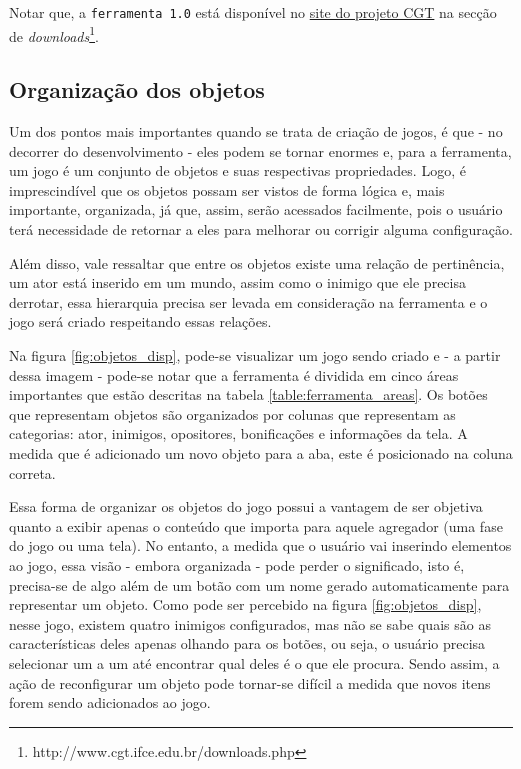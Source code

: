 \documentclass[12pt,twoside,openright,a4paper,english,brazil,sumario=tradicional]{abntex2}
\begin{document}
Notar que, a \texttt{ferramenta 1.0} está disponível no \href{http://www.cgt.ifce.edu.br/downloads.php}{site do projeto CGT} na secção de \emph{downloads}\footnote{http://www.cgt.ifce.edu.br/downloads.php}.

\subsection{Organização dos objetos}
\label{sec:orga-objetos}
Um dos pontos mais importantes quando se trata de criação de jogos, é que - no decorrer do desenvolvimento - eles podem se tornar enormes e, para a ferramenta, um jogo é um conjunto de objetos e suas respectivas propriedades. Logo, é imprescindível que os objetos possam ser vistos de forma lógica e, mais importante, organizada, já que, assim, serão acessados facilmente, pois o usuário terá necessidade de retornar a eles para melhorar ou corrigir alguma configuração.

Além disso, vale ressaltar que entre os objetos existe uma relação de pertinência, um ator está inserido em um mundo, assim como o inimigo que ele precisa derrotar, essa hierarquia precisa ser levada em consideração na ferramenta e o jogo será criado respeitando essas relações.

Na figura \ref{fig:objetos_disp}, pode-se visualizar um jogo sendo criado e - a partir dessa imagem - pode-se notar que a ferramenta é dividida em cinco áreas importantes que estão descritas na tabela \ref{table:ferramenta_areas}. Os botões que representam objetos são organizados por colunas que representam as categorias: ator, inimigos, opositores, bonificações e informações da tela. A medida que é adicionado um novo objeto para a aba, este é posicionado na coluna correta.

Essa forma de organizar os objetos do jogo possui a vantagem de ser objetiva quanto a exibir apenas o conteúdo que importa para aquele agregador (uma fase do jogo ou uma tela). No entanto, a medida que o usuário vai inserindo elementos ao jogo, essa visão - embora organizada - pode perder o significado, isto é, precisa-se de algo além de um botão com um nome gerado automaticamente para representar um objeto. Como pode ser percebido na figura \ref{fig:objetos_disp}, nesse jogo, existem quatro inimigos configurados, mas não se sabe quais são as características deles apenas olhando para os botões, ou seja, o usuário precisa selecionar um a um até encontrar qual deles é o que ele procura. Sendo assim, a ação de reconfigurar um objeto pode tornar-se difícil a medida que novos itens forem sendo adicionados ao jogo.
\end{document}
